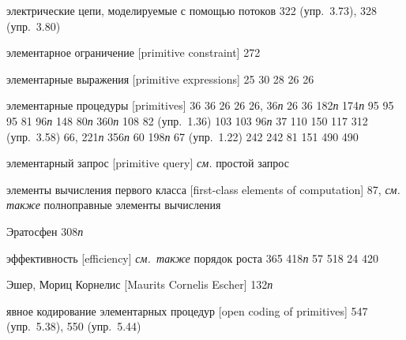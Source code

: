 \begin{theindex}
\item {электрические цепи, моделируемые с помощью потоков} 322 (упр.~3.73), 328 (упр.~3.80)
\item {элементарное ограничение [primitive constraint]} 272
\item {элементарные выражения [primitive expressions]} 25
   30
   28
   26
   26
\item {элементарные процедуры [primitives]}
  \subitem {\texttt{<}} 36
  \subitem {\texttt{>}} 36
  \subitem {{\tt *}} 26
  \subitem {{\tt +}} 26
  \subitem {{\tt -}} 26, 36{\it п}
  \subitem {{\tt /}} 26
  \subitem {{\tt =}} 36
   182{\it п}
   174{\it п}
   95
   95
   95
   81
   96{\it п}
   148
   80{\it п}
   360{\it п}
   108
   82 (упр.~1.36)
   103
   103
   96{\it п}
   37
   110
   150
   117
   312 (упр.~3.58)
   66, 221{\it п}
   356{\it п}
   60
   198{\it п}
   67 (упр.~1.22)
   242
   242
   81
   151
   490
   490
\item {элементарный запрос [primitive query]} {\it см.} простой запрос
\item {элементы вычисления первого класса [first-class elements of computation]} 87, {\it см. также} полноправные элементы вычисления
\item {Эратосфен} 308{\it п}
\item {эффективность [efficiency]} {\it см.~также} порядок роста
   365
   418{\it п}
   57
   518
   24
   420
\item {Эшер, Мориц Корнелис [Maurits Cornelis Escher]} 132{\it п}
\bigskip
\item {явное кодирование элементарных процедур [open coding of primitives]} 547 (упр.~5.38), 550 (упр.~5.44)

\end{theindex}
